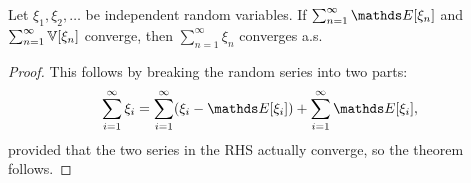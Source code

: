 \begin{theorem} \label{thm:three_series_2}
Let $\xi_1, \xi_2, \dots$ be independent random variables. If $\sum_{n=1}^\infty \E[\xi_n]$ and $\sum_{n=1}^\infty \mathbb{V}[\xi_n]$ converge, then $\sum_{n=1}^\infty \xi_n$ converges a.s.
\end{theorem}

\begin{proof}
This follows by breaking the random series into two parts:
\begin{equation}
\sum_{i=1}^\infty \xi_i = \sum_{i=1}^\infty (\xi_i - \E[\xi_i]) + \sum_{i=1}^\infty \E[\xi_i],
\end{equation}
provided that the two series in the RHS actually converge, so the theorem follows.
\end{proof}

